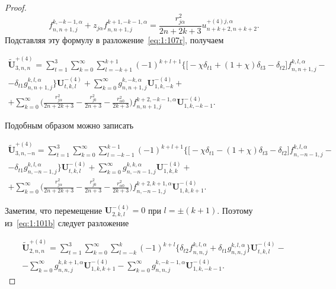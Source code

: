 \begin{proof}
\begin{equation*}
{f}_{n,n+1,j}^{k,-k-1,\alpha}+z_{j\alpha}{f}_{n,n+1,j}^{k+1,-k-1,\alpha}=\frac{r_{j\alpha}^2}{2n+2k+3}u_{n+k+2,n+k+2}^{+(4)j,\alpha}.
\end{equation*}
Подставляя эту формулу в разложение~\eqref{eq:1:107r}, получаем

\begin{multline}
\mathbf{\tilde U}_{3,n,n}^{+(4)}=\sum\limits_{t=1}^3\sum\limits_{k=0}^\infty\sum\limits_{l=-k+1}^{k+1}(-1)^{k+l+1}\bigg\{\bigg\lbrack-\chi\delta_{t1}+(1+\chi)\delta_{t3}-\delta_{t2}
\bigg\rbrack{f}_{n,n+1,j}^{k,l,\alpha}- \\
-\delta_{t1}{g}_{n,n+1,j}^{k,l,\alpha}\bigg\}\mathbf{U}_{t,k,l}^{-(4)}+\sum\limits_{k=0}^\infty{g}_{n,n+1,j}^{k,-k,\alpha}\mathbf{U}_{1,k,-k}^{-(4)}+ \\
+\sum\limits_{k=0}^\infty
\bigg(\frac{r_{j\alpha}^2}{2n+2k+3}-\frac{r_{j0}^2}{2n+3}-\frac{r_{\alpha 0}^2}{2k+3}\bigg){f}_{n,n+1,j}^{k+2,-k-1,\alpha}\mathbf{U}_{1,k,-k-1}^{-(4)}.
\label{eq:1:109r}
\end{multline}

Подобным образом можно записать

\begin{multline}
\mathbf{\tilde U}_{3,n,-n}^{+(4)}=\sum\limits_{t=1}^3\sum\limits_{k=0}^\infty\sum\limits_{l=-k-1}^{k-1}(-1)^{k+l+1}\bigg\{\bigg\lbrack-\chi\delta_{t1}-(1+\chi)\delta_{t3}-\delta_{t2}
\bigg\rbrack{f}_{n,-n-1,j}^{k,l,\alpha}- \\
-\delta_{t1}{g}_{n,-n-1,j}^{k,l,\alpha}\bigg\}\mathbf{U}_{t,k,l}^{-(4)}+\sum\limits_{k=0}^\infty{g}_{n,-n-1,j}^{k,k,\alpha}\mathbf{U}_{1,k,k}^{-(4)}+ \\
+\sum\limits_{k=0}^\infty
\bigg(\frac{r_{j\alpha}^2}{2n+2k+3}-\frac{r_{j0}^2}{2n+3}-\frac{r_{\alpha 0}^2}{2k+3}\bigg){f}_{n,-n-1,j}^{k+2,k+1,\alpha}\mathbf{U}_{1,k,k+1}^{-(4)}.
\label{eq:1:110r}
\end{multline}

Заметим, что перемещение $\mathbf{U}_{2,k,l}^{-(4)}=0$ при $l=\pm(k+1)$. Поэтому из~\eqref{eq:1:101b} следует разложение

\begin{multline}
\mathbf{\tilde U}_{2,n,n}^{+(4)}=\sum\limits_{t=1}^3\sum\limits_{k=0}^\infty\sum\limits_{l=-k}^{k}(-1)^{k+l}\bigg\{\delta_{t2}{f}_{n,n,j}^{k,l,\alpha}+\delta_{t1}{g}_{n,n,j}^{k,l,\alpha}\bigg\}\mathbf{U}_{t,k,l}^{-(4)}- \\
-\sum\limits_{k=0}^\infty{g}_{n,n,j}^{k,k+1,\alpha}\mathbf{U}_{1,k,k+1}^{-(4)}-\sum\limits_{k=0}^\infty{g}_{n,n,j}^{k,-k-1,\alpha}\mathbf{U}_{1,k,-k-1}^{-(4)}.
\label{eq:1:112r}
\end{multline}


\end{proof}
